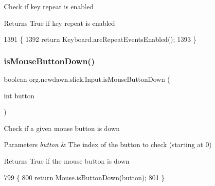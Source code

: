 Check if key repeat is enabled

\begin{DoxyReturn}{Returns}
True if key repeat is enabled 
\end{DoxyReturn}

\begin{DoxyCode}
1391                                         \{
1392         \textcolor{keywordflow}{return} Keyboard.areRepeatEventsEnabled();
1393     \}
\end{DoxyCode}
\mbox{\label{classorg_1_1newdawn_1_1slick_1_1_input_aa563da1219078da62ff43ba88edbbb44}} 
\subsubsection{\texorpdfstring{is\+Mouse\+Button\+Down()}{isMouseButtonDown()}}
{\footnotesize\ttfamily boolean org.\+newdawn.\+slick.\+Input.\+is\+Mouse\+Button\+Down (\begin{DoxyParamCaption}\item[{int}]{button }\end{DoxyParamCaption})\hspace{0.3cm}{\ttfamily [inline]}}

Check if a given mouse button is down


\begin{DoxyParams}{Parameters}
{\em button} & The index of the button to check (starting at 0) \\
\hline
\end{DoxyParams}
\begin{DoxyReturn}{Returns}
True if the mouse button is down 
\end{DoxyReturn}

\begin{DoxyCode}
799                                                  \{
800         \textcolor{keywordflow}{return} Mouse.isButtonDown(button);
801     \}
\end{DoxyCode}
\mbox{\label{classorg_1_1newdawn_1_1slick_1_1_input_af189465ee4d9e4f73b8883ff54b3b950}} 
